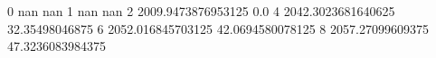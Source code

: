 0 nan nan
1 nan nan
2 2009.9473876953125 0.0
4 2042.3023681640625 32.35498046875
6 2052.016845703125 42.0694580078125
8 2057.27099609375 47.3236083984375
